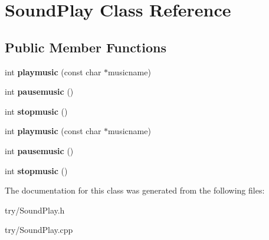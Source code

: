 \hypertarget{classSoundPlay}{}\section{Sound\+Play Class Reference}
\label{classSoundPlay}
\subsection*{Public Member Functions}
\begin{DoxyCompactItemize}
\item 
\mbox{\label{classSoundPlay_a073e3f198845301ebeee13608101a9ea}} 
int {\bfseries playmusic} (const char $\ast$musicname)
\item 
\mbox{\label{classSoundPlay_a5cb1d131745c4f7000d5d04ecc689fcb}} 
int {\bfseries pausemusic} ()
\item 
\mbox{\label{classSoundPlay_aa23f782f21b794bddce62bd14da1ef32}} 
int {\bfseries stopmusic} ()
\item 
\mbox{\label{classSoundPlay_a073e3f198845301ebeee13608101a9ea}} 
int {\bfseries playmusic} (const char $\ast$musicname)
\item 
\mbox{\label{classSoundPlay_a5cb1d131745c4f7000d5d04ecc689fcb}} 
int {\bfseries pausemusic} ()
\item 
\mbox{\label{classSoundPlay_aa23f782f21b794bddce62bd14da1ef32}} 
int {\bfseries stopmusic} ()
\end{DoxyCompactItemize}


The documentation for this class was generated from the following files\+:\begin{DoxyCompactItemize}
\item 
try/Sound\+Play.\+h\item 
try/Sound\+Play.\+cpp\end{DoxyCompactItemize}
